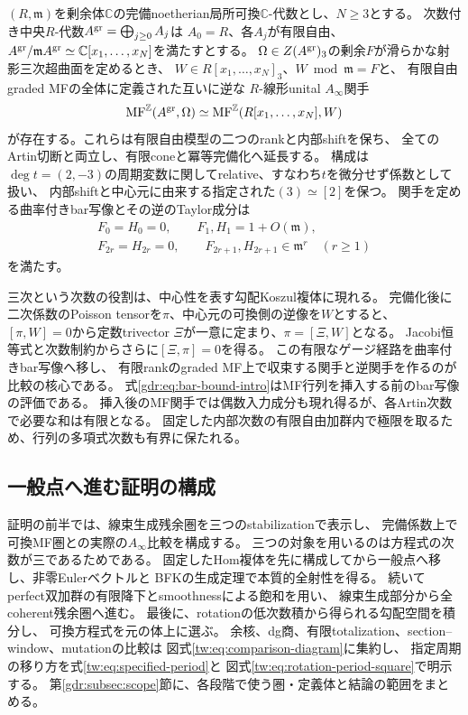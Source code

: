 \begin{theorem}
\label{gdr:thm:complete-intro}
$(R,\mathfrak m)$を剰余体$\mathbb C$の完備noetherian局所可換$\mathbb C$-代数とし、$N\ge3$とする。
次数付き中央$R$-代数$A^{\rm gr}=\bigoplus_{j\ge0}A_j$は
$A_0=R$、各$A_j$が有限自由、
$A^{\rm gr}/\mathfrak mA^{\rm gr}\simeq\mathbb C[x_1,\ldots,x_N]$を満たすとする。
$\Omega\in Z(A^{\rm gr})_3$の剰余$F$が滑らかな射影三次超曲面を定めるとき、
$W\in R[x_1,\ldots,x_N]_3$、$W\bmod\mathfrak m=F$と、
有限自由graded MFの全体に定義された互いに逆な
$R$-線形unital $A_\infty$関手
\begin{equation}\label{gdr:eq:complete-intro}
 \operatorname{MF}^{\mathbb Z}(A^{\rm gr},\Omega)
 \simeq\operatorname{MF}^{\mathbb Z}(R[x_1,\ldots,x_N],W)
\end{equation}
が存在する。これらは有限自由模型の二つのrankと内部shiftを保ち、
全てのArtin切断と両立し、有限coneと冪等完備化へ延長する。
構成は$\deg t=(2,-3)$の周期変数に関してrelative、すなわち$t$を微分せず係数として扱い、
内部shiftと中心元に由来する指定された$(3)\simeq[2]$を保つ。
関手を定める曲率付きbar写像とその逆のTaylor成分は
\begin{equation}\label{gdr:eq:bar-bound-intro}
 \begin{gathered}
 F_0=H_0=0,\qquad F_1,H_1=1+O(\mathfrak m),\\
 F_{2r}=H_{2r}=0,\qquad F_{2r+1},H_{2r+1}\in\mathfrak m^r\quad(r\ge1)
 \end{gathered}
\end{equation}
を満たす。
\end{theorem}

三次という次数の役割は、中心性を表す勾配Koszul複体に現れる。
完備化後に二次係数のPoisson tensorを$\pi$、中心元の可換側の逆像を$W$とすると、
$[\pi,W]=0$から定数trivector $\Xi$が一意に定まり、$\pi=[\Xi,W]$となる。
Jacobi恒等式と次数制約からさらに$[\Xi,\pi]=0$を得る。
この有限なゲージ経路を曲率付きbar写像へ移し、
有限rankのgraded MF上で収束する関手と逆関手を作るのが比較の核心である。
式\eqref{gdr:eq:bar-bound-intro}はMF行列を挿入する前のbar写像の評価である。
挿入後のMF関手では偶数入力成分も現れ得るが、各Artin次数で必要な和は有限となる。
固定した内部次数の有限自由加群内で極限を取るため、行列の多項式次数も有界に保たれる。

\subsection{一般点へ進む証明の構成}
証明の前半では、線束生成残余圏を三つのstabilizationで表示し、
完備係数上で可換MF圏との実際の$A_\infty$比較を構成する。
三つの対象を用いるのは方程式の次数が三であるためである。
固定したHom複体を先に構成してから一般点へ移し、非零Eulerベクトルと
BFKの生成定理\cite{GCDBFK}で本質的全射性を得る。
続いてperfect双加群の有限降下とsmoothnessによる飽和を用い、
線束生成部分から全coherent残余圏へ進む。
最後に、rotationの低次数積から得られる勾配空間を積分し、
可換方程式を元の体上に選ぶ。
余核、dg商、有限totalization、section--window、mutationの比較は
図式\eqref{tw:eq:comparison-diagram}に集約し、
指定周期の移り方を式\eqref{tw:eq:specified-period}と
図式\eqref{tw:eq:rotation-period-square}で明示する。
第\ref{gdr:subsec:scope}節に、各段階で使う圏・定義体と結論の範囲をまとめる。

